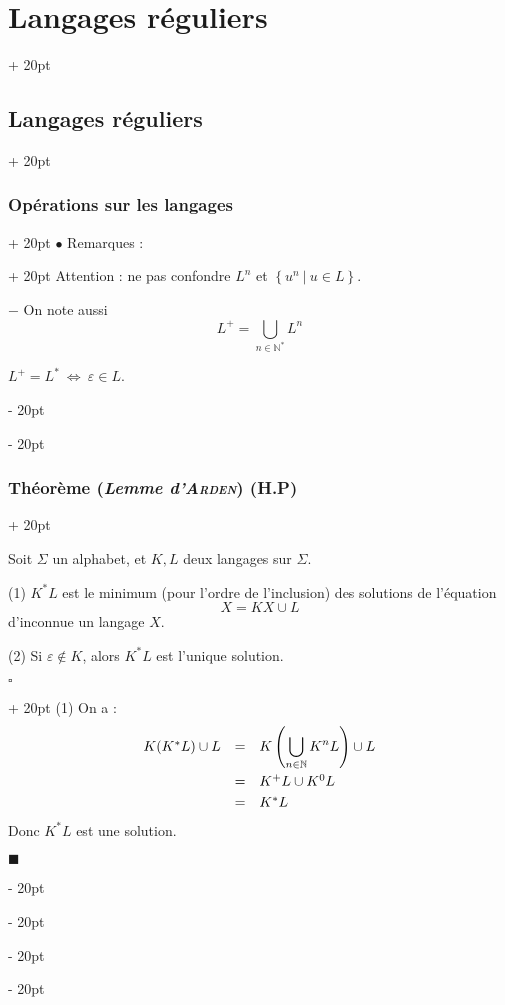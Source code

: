 \documentclass[a4paper, 12pt, twoside]{article}
\newcommand{\N}{\mathbb{N}} %
\newcommand{\lr}[1]{\left( #1 \right)}
\newcommand{\set}[1]{\left\{ #1 \right\}}
\newcommand{\ssi}{\ \Leftrightarrow \ }
\newcommand{\ind}[1][20pt]{\advance\leftskip + #1}
\newcommand{\deind}[1][20pt]{\advance\leftskip - #1}
\newenvironment{indt}[2][20pt]{#2 \par \ind[#1]}{\par \deind} %
\newenvironment{proof}[1][{}]{\begin{indt}{$\square$ #1}}{$\blacksquare$ \end{indt}}
\begin{document}
\begin{indt}{\section{Langages réguliers}}
\begin{indt}{\subsection{Langages réguliers}}
\begin{indt}{\subsubsection{Opérations sur les langages}}
\begin{indt}{$\bullet$ Remarques :}
                    Attention : ne pas confondre $L^n$ et $\set{u^n\ |\ u \in L}$.

                    $-$ On note aussi
                    \[
                        L^+ = \bigcup_{n \in \N^*} L^n
                    \]

                    \vspace{6pt}
                    
                     $L^+ = L^* \ssi \varepsilon \in L$.
                \end{indt}
            \end{indt}

            \vspace{12pt}
            
            \begin{indt}{\subsubsection{Théorème (\textit{Lemme d'\textsc{Arden}}) (H.P)}}
                \begin{emphBox}
                    Soit $\Sigma$ un alphabet, et $K, L$ deux langages sur $\Sigma$.

                    (1) $K^* L$ est le minimum (pour l'ordre de l'inclusion) des solutions de l'équation
                    \[
                        X = K X \cup L
                    \]
                    d'inconnue un langage $X$.

                    \vspace{6pt}
                    
                    (2) Si $\varepsilon \notin K$, alors $K^* L$ est l'unique solution.
                \end{emphBox}

                \vspace{12pt}
                
                \begin{proof}
                    (1) On a :
                    \[
                        \begin{array}{rcl}
                            K(K^*L)\cup L
                            &=& \displaystyle K\lr{\bigcup_{n \in \N} K^n L} \cup L
                            \vspace{3pt}
                            \\
                            &=& K^+ L \cup K^0 L
                            \vspace{3pt}
                            \\
                            &=&K^* L
                        \end{array}
                    \]
                    Donc $K^*L$ est une solution.


\end{proof}
\end{indt}
\end{indt}
\end{indt}
\end{document}
